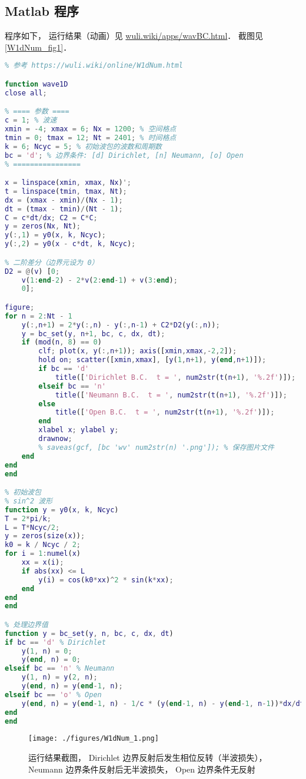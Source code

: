 \subsection{Matlab 程序}
程序如下， 运行结果（动画）见 \href{https://wuli.wiki/apps/wavBC.html}{wuli.wiki/apps/wavBC.html}． 截图见\autoref{W1dNum_fig1}．

\begin{lstlisting}[language=matlab, caption=wave1D.m]
% 一维波动方程数值解
% 参考 https://wuli.wiki/online/W1dNum.html

function wave1D
close all;

% ==== 参数 ====
c = 1; % 波速
xmin = -4; xmax = 6; Nx = 1200; % 空间格点
tmin = 0; tmax = 12; Nt = 2401; % 时间格点
k = 6; Ncyc = 5; % 初始波包的波数和周期数
bc = 'd'; % 边界条件: [d] Dirichlet, [n] Neumann, [o] Open
% ================

x = linspace(xmin, xmax, Nx)';
t = linspace(tmin, tmax, Nt);
dx = (xmax - xmin)/(Nx - 1);
dt = (tmax - tmin)/(Nt - 1);
C = c*dt/dx; C2 = C*C;
y = zeros(Nx, Nt);
y(:,1) = y0(x, k, Ncyc);
y(:,2) = y0(x - c*dt, k, Ncyc);

% 二阶差分（边界元设为 0）
D2 = @(v) [0;
    v(1:end-2) - 2*v(2:end-1) + v(3:end);
    0];

figure;
for n = 2:Nt - 1
    y(:,n+1) = 2*y(:,n) - y(:,n-1) + C2*D2(y(:,n));
    y = bc_set(y, n+1, bc, c, dx, dt);
    if (mod(n, 8) == 0)
        clf; plot(x, y(:,n+1)); axis([xmin,xmax,-2,2]);
        hold on; scatter([xmin,xmax], [y(1,n+1), y(end,n+1)]);
        if bc == 'd'
            title(['Dirichlet B.C.  t = ', num2str(t(n+1), '%.2f')]);
        elseif bc == 'n'
            title(['Neumann B.C.  t = ', num2str(t(n+1), '%.2f')]);
        else
            title(['Open B.C.  t = ', num2str(t(n+1), '%.2f')]);
        end
        xlabel x; ylabel y;
        drawnow;
        % saveas(gcf, [bc 'wv' num2str(n) '.png']); % 保存图片文件
    end
end
end

% 初始波包
% sin^2 波形
function y = y0(x, k, Ncyc)
T = 2*pi/k;
L = T*Ncyc/2;
y = zeros(size(x));
k0 = k / Ncyc / 2;
for i = 1:numel(x)
    xx = x(i);
    if abs(xx) <= L
        y(i) = cos(k0*xx)^2 * sin(k*xx);
    end
end
end

% 处理边界值
function y = bc_set(y, n, bc, c, dx, dt)
if bc == 'd' % Dirichlet
    y(1, n) = 0;
    y(end, n) = 0;
elseif bc == 'n' % Neumann
    y(1, n) = y(2, n);
    y(end, n) = y(end-1, n);
elseif bc == 'o' % Open
    y(end, n) = y(end-1, n) - 1/c * (y(end-1, n) - y(end-1, n-1))*dx/dt;
end
end
\end{lstlisting}

\begin{figure}[ht]
\centering
\texttt{[image: ./figures/W1dNum\_1.png]}
\caption{运行结果截图， Dirichlet 边界反射后发生相位反转（半波损失）， Neumann 边界条件反射后无半波损失， Open 边界条件无反射} \label{W1dNum_fig1}
\end{figure}
